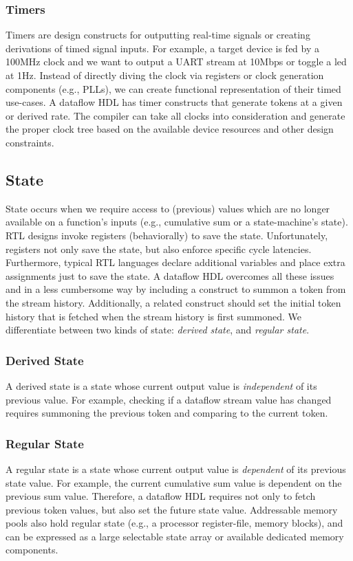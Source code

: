 \subsubsection{Timers}
Timers are design constructs for outputting real-time signals or creating derivations of timed signal inputs. For example, a target device is fed by a 100MHz clock and we want to output a UART stream at 10Mbps or toggle a led at 1Hz. Instead of directly diving the clock via registers or clock generation components (e.g., PLLs), we can create functional representation of their timed use-cases. A dataflow HDL has timer constructs that generate tokens at a given or derived rate. The compiler can take all clocks into consideration and generate the proper clock tree based on the available device resources and other design constraints. 

\subsection{State}
State occurs when we require access to (previous) values which are no longer available on a function's inputs (e.g., cumulative sum or a state-machine's state). RTL designs invoke registers (behaviorally) to save the state. Unfortunately, registers not only save the state, but also enforce specific cycle latencies. Furthermore, typical RTL languages declare additional variables and place extra assignments just to save the state. A dataflow HDL overcomes all these issues and in a less cumbersome way by including a construct to summon a token from the stream history. Additionally, a related construct should set the initial token history that is fetched when the stream history is first summoned.
We differentiate between two kinds of state: \textit{derived state}, and \textit{regular state}. 


\subsubsection{Derived State} 
A derived state is a state whose current output value is \textit{independent} of its previous value. For example, checking if a dataflow stream value has changed requires summoning the previous token and comparing to the current token. 

\subsubsection{Regular State} 
A regular state is a state whose current output value is \textit{dependent} of its previous state value. For example, the current cumulative sum value is dependent on the previous sum value. Therefore, a dataflow HDL requires not only to fetch previous token values, but also set the future state value. Addressable memory pools also hold regular state (e.g., a processor register-file, memory blocks), and can be expressed as a large selectable state array or available dedicated memory components.

